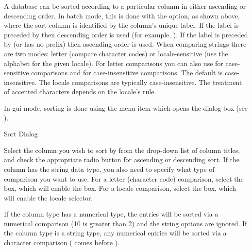 A database can be sorted according to a particular column
in either ascending or descending order. In batch mode, this is done
with the  option, as shown above, where the sort column is identified
by the column's unique label. If the label is preceded by \code{-} then
descending order is used (for example, ). If the label is preceded by \code{+} (or has
no prefix) then ascending order is used. When comparing strings there are 
two modes: letter (compare character codes) or locale-sensitive
(use the alphabet for the given locale).
For letter comparisons you 
can also use  for case-sensitive comparisons
and  for case-insensitive comparisons.
The default is case-insensitive. The locale comparisons are
typically case-insensitive. The treatment of accented characters depends
on the locale's rule.

In \gls{gui} mode, sorting is
done using the  menu item which opens
the  dialog box (see ).

 {%
 }
 {Sort Dialog}

Select the column you wish to sort by from the drop-down list of column
titles, and check the appropriate radio button for ascending or descending
sort. If the column has the string data type, you also need to specify
what type of comparison you want to use. For a letter (character code)
comparison, select the  box, which will enable
the  box. For a locale comparison,
select the  box, which will enable the
locale selector.

If the column type has a numerical type, the entries will be sorted via 
a numerical comparison (10 is greater than 2) and the string
options are ignored. If the column type is a string type,
any numerical entries will be sorted via a character comparison (
comes before ).

